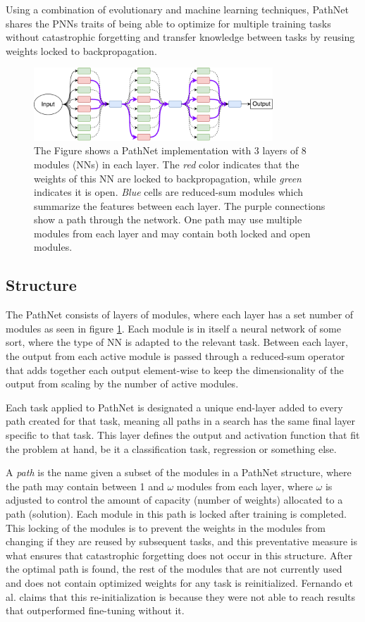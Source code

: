 Using a combination of evolutionary and machine learning techniques, PathNet shares the PNNs traits of being able to optimize for multiple training tasks without catastrophic forgetting and transfer knowledge between tasks by reusing weights locked to backpropagation.  
\begin{figure}[ht]
    \centering
    \includegraphics[width=0.8\textwidth]{Chapters/2.Background/figures/PathNet.pdf}
    \caption[PathNet structure]{The Figure shows a PathNet implementation with 3 layers of 8 modules (NNs) in each layer. The \textit{red} color indicates that the weights of this NN are locked to backpropagation, while \textit{green} indicates it is open. \textit{Blue} cells are reduced-sum modules which summarize the features between each layer. The purple connections show a path through the network. One path may use multiple modules from each layer and may contain both locked and open modules.}
    \label{fig:pathnet}
\end{figure}

\subsection{Structure}
The PathNet consists of layers of modules, where each layer has a set number of modules as seen in figure \ref{fig:pathnet}. Each module is in itself a neural network of some sort, where the type of NN is adapted to the relevant task. Between each layer, the output from each active module is passed through a reduced-sum operator that adds together each output element-wise to keep the dimensionality of the output from scaling by the number of active modules. 

Each task applied to PathNet is designated a unique end-layer added to every path created for that task, meaning all paths in a search has the same final layer specific to that task. This layer defines the output and activation function that fit the problem at hand, be it a classification task, regression or something else.  

A \textit{path} is the name given a subset of the modules in a PathNet structure, where the path may contain between 1 and \(\omega\) modules from each layer, where \(\omega\) is adjusted to control the amount of capacity (number of weights) allocated to a path (solution). Each module in this path is locked after training is completed. This locking of the modules is to prevent the weights in the modules from changing if they are reused by subsequent tasks, and this preventative measure is what ensures that catastrophic forgetting does not occur in this structure. After the optimal path is found, the rest of the modules that are not currently used and does not contain optimized weights for any task is reinitialized. Fernando et al. claims\cite{pathnet} that this re-initialization is because they were not able to reach results that outperformed fine-tuning without it.

